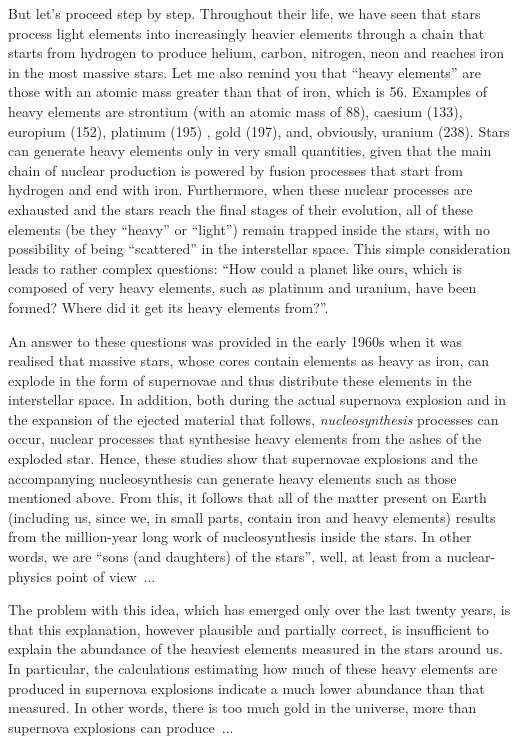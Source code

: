 But let's proceed step by step. Throughout their life, we have seen that stars process
light elements into increasingly heavier elements through a chain that starts from
hydrogen to produce helium, carbon, nitrogen, neon and reaches iron
in the most massive stars. Let me also remind you that ``heavy elements'' are those with
an atomic mass greater than that of iron, which is
56. Examples of heavy elements are strontium (with an atomic mass of
88), caesium (133), europium (152), platinum (195) ,
gold (197), and, obviously, uranium (238). Stars can generate heavy
elements only in very small quantities, given that the main chain of nuclear production
is powered by fusion processes that start from hydrogen and end with iron. Furthermore,
when these nuclear processes are exhausted and the stars reach the final stages of their
evolution, all of these elements (be they ``heavy'' or ``light'') remain trapped inside
the stars, with no possibility of being ``scattered'' in the interstellar space. This
simple consideration leads to rather complex questions: ``How could a planet like ours,
which is composed of very heavy elements, such as platinum and uranium, have been
formed? Where did it get its heavy elements from?''.

An answer to these questions was provided in the early 1960s when it was realised that
massive stars, whose cores contain elements as heavy as iron, can explode in the form of
supernovae and thus distribute these elements in the interstellar space. In addition,
both during the actual supernova explosion and in the expansion of
the ejected material that follows, \emph{nucleosynthesis} processes can occur, nuclear
processes that synthesise heavy elements from the ashes of the exploded star. Hence,
these studies show that supernovae explosions and the accompanying nucleosynthesis can
generate heavy elements such as those mentioned above. From this, it follows that all of
the matter present on Earth (including us, since we, in small parts, contain
iron and heavy elements) results from the million-year long work of
nucleosynthesis inside the stars. In other words, we are ``sons (and daughters) of the
stars'', well, at least from a nuclear- physics point of view~...

The problem with this idea, which has emerged only over the last twenty years, is that
this explanation, however plausible and partially correct, is insufficient to explain
the abundance of the heaviest elements measured in the stars around us. In particular,
the calculations estimating how much of these heavy elements are produced in supernova
explosions indicate a much lower abundance than that measured. In other words, there is
too much gold in the universe, more than supernova explosions can
produce~...

